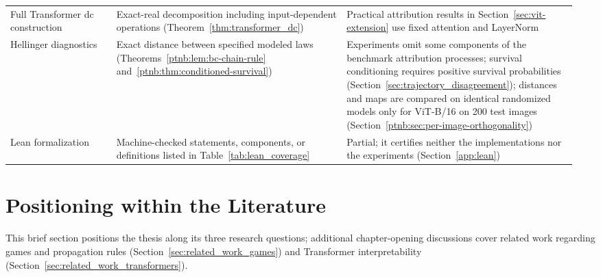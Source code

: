 {\begin{longtable}{@{}>{\raggedright\arraybackslash}p{0.18\linewidth}>{\raggedright\arraybackslash}p{0.39\linewidth}>{\raggedright\arraybackslash}p{0.39\linewidth}@{}}
\addlinespace
Full Transformer \acs{dc} construction & Exact-real decomposition including input-dependent operations (Theorem~\ref{thm:transformer_dc}) & Practical attribution results in Section~\ref{sec:vit-extension} use fixed attention and LayerNorm \\
\addlinespace
Hellinger diagnostics & Exact distance between specified modeled laws (Theorems~\ref{ptnb:lem:bc-chain-rule} and~\ref{ptnb:thm:conditioned-survival}) & Experiments omit some components of the benchmark attribution processes; survival conditioning requires positive survival probabilities (Section~\ref{sec:trajectory_disagreement}); distances and maps are compared on identical randomized models only for ViT-B/16 on 200 test images (Section~\ref{ptnb:sec:per-image-orthogonality}) \\
\addlinespace
Lean formalization & Machine-checked statements, components, or definitions listed in Table~\ref{tab:lean_coverage} & Partial; it certifies neither the implementations nor the experiments (Section~\ref{app:lean}) \\
\end{longtable}%
}
\endgroup


\section{Positioning within the Literature}\label{sec:related_work}

This brief section positions the thesis along its three research questions; additional chapter-opening discussions cover related work regarding games and propagation rules (Section~\ref{sec:related_work_games}) and Transformer interpretability (Section~\ref{sec:related_work_transformers}).

